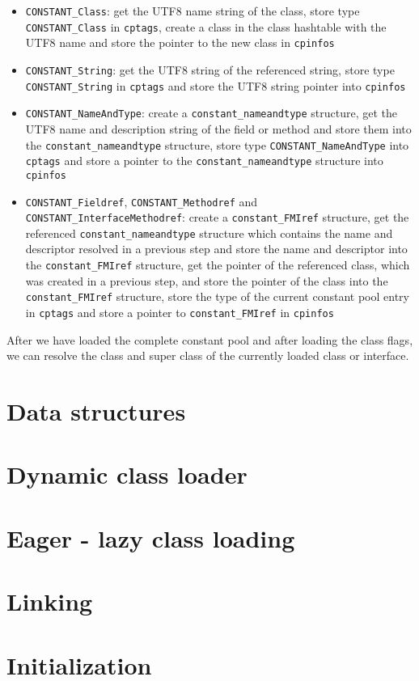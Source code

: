 \begin{itemize}
 \item \texttt{CONSTANT\_Class}: get the UTF8 name string of the
 class, store type \texttt{CONSTANT\_Class} in \texttt{cptags}, create
 a class in the class hashtable with the UTF8 name and store the
 pointer to the new class in \texttt{cpinfos}

 \item \texttt{CONSTANT\_String}: get the UTF8 string of the
 referenced string, store type \texttt{CONSTANT\_String} in
 \texttt{cptags} and store the UTF8 string pointer into
 \texttt{cpinfos}

 \item \texttt{CONSTANT\_NameAndType}: create a
 \texttt{constant\_nameandtype} structure, get the UTF8 name and
 description string of the field or method and store them into the
 \texttt{constant\_nameandtype} structure, store type
 \texttt{CONSTANT\_NameAndType} into \texttt{cptags} and store a
 pointer to the \texttt{constant\_nameandtype} structure into
 \texttt{cpinfos}

 \item \texttt{CONSTANT\_Fieldref}, \texttt{CONSTANT\_Methodref} and
 \texttt{CONSTANT\_InterfaceMethodref}: create a
 \texttt{constant\_FMIref} structure, get the referenced
 \texttt{constant\_nameandtype} structure which contains the name and
 descriptor resolved in a previous step and store the name and
 descriptor into the \texttt{constant\_FMIref} structure, get the
 pointer of the referenced class, which was created in a previous
 step, and store the pointer of the class into the
 \texttt{constant\_FMIref} structure, store the type of the current
 constant pool entry in \texttt{cptags} and store a pointer to
 \texttt{constant\_FMIref} in \texttt{cpinfos}
\end{itemize}

After we have loaded the complete constant pool and after loading the
class flags, we can resolve the class and super class of the currently
loaded class or interface.


\section{Data structures}

\section{Dynamic class loader}

\section{Eager - lazy class loading}

\section{Linking}

\section{Initialization}
